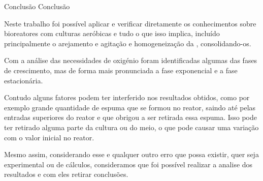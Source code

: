 \documentclass[\mainfilename]{subfiles}
\begin{document}

{Conclusão} %
{Conclusão} %

Neste trabalho foi possível aplicar e verificar diretamente os conhecimentos sobre bioreatores com culturas aeróbicas e tudo o que isso implica, incluído principalmente o arejamento e agitação e homogeneização da , consolidando-os.\par
Com a análise das necessidades de oxigénio foram identificadas algumas das fases de crescimento, mas de forma mais pronunciada a fase exponencial e a fase estacionária.\par
Contudo alguns fatores podem ter interferido nos resultados obtidos, como por exemplo grande quantidade de espuma que se formou no reator, saindo até pelas entradas superiores do reator e que obrigou a ser retirada essa espuma. Isso pode ter retirado alguma parte da cultura ou do meio, o que pode causar uma variação com o valor inicial no reator.\par
Mesmo assim, considerando esse e qualquer outro erro que possa existir, quer seja experimental ou de cálculos,  consideramos que foi possível realizar a analise dos resultados e com eles retirar conclusões.
\end{document}
